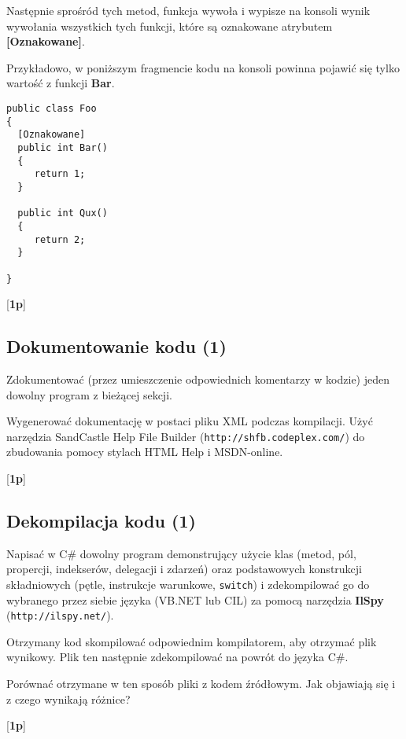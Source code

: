 	Następnie sprośród tych metod, funkcja wywoła i wypisze na konsoli wynik wywołania wszystkich tych funkcji, które są oznakowane
	atrybutem {\bf [Oznakowane]}.
	
	Przykładowo, w poniższym fragmencie kodu na konsoli powinna pojawić się tylko wartość z funkcji {\bf Bar}.
	
\begin{verbatim}
public class Foo
{
  [Oznakowane]
  public int Bar()
  {
     return 1;
  }
  
  public int Qux()
  {
     return 2;
  }
  
}
\end{verbatim}	

      [{\bf 1p}]

\subsection{Dokumentowanie kodu (1)}

      Zdokumentować (przez umieszczenie odpowiednich komentarzy w kodzie)
\label{dokumentowanie}	  
      jeden dowolny program z bieżącej sekcji. 

      Wygenerować dokumentację w postaci pliku XML podczas kompilacji. Użyć
      narzędzia SandCastle Help File Builder ({\tt http://shfb.codeplex.com/}) do zbudowania
      pomocy stylach HTML Help i MSDN-online.

      [{\bf 1p}]

\subsection{Dekompilacja kodu (1)}

      Napisać w C\# dowolny program demonstrujący użycie klas (metod, pól, propercji, indekserów, delegacji i zdarzeń) oraz podstawowych
\label{dekompilacja}	  
      konstrukcji składniowych (pętle, instrukcje warunkowe, {\tt switch})
      i zdekompilować go do wybranego przez siebie języka (VB.NET lub CIL)
      za pomocą narzędzia {\bf IlSpy} ({\tt http://ilspy.net/}).
      
      Otrzymany kod skompilować odpowiednim kompilatorem, aby otrzymać plik wynikowy.
      Plik ten następnie zdekompilować na powrót do języka C\#.
      
      Porównać otrzymane w ten sposób pliki z kodem źródłowym.
      Jak objawiają się i z czego wynikają różnice?

      [{\bf 1p}]
